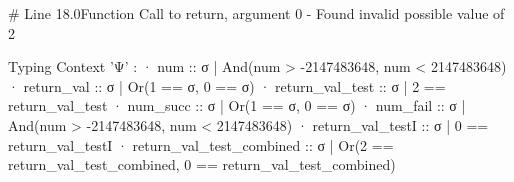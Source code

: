# Line 18.0Function Call to return, argument 0 - Found invalid possible value of 2

Typing Context 'Ψ' :
 · num                      :: σ | And(num > -2147483648, num < 2147483648)
 · return_val               :: σ | Or(1 == σ, 0 == σ)
 · return_val_test          :: σ | 2 == return_val_test
 · num_succ                 :: σ | Or(1 == σ, 0 == σ)
 · num_fail                 :: σ | And(num > -2147483648, num < 2147483648)
 · return_val_testI         :: σ | 0 == return_val_testI
 · return_val_test_combined :: σ | Or(2 == return_val_test_combined,
   0 == return_val_test_combined)
